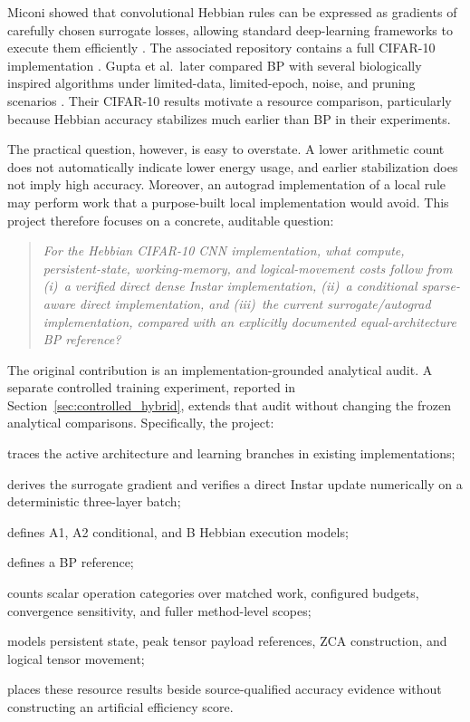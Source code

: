 \documentclass{article}
\begin{document}
    Miconi showed that convolutional Hebbian rules can be expressed as gradients of carefully chosen surrogate losses, allowing standard deep-learning frameworks to execute them efficiently \citep{miconi2021hebbian}. The associated repository contains a full CIFAR-10 implementation \citep{miconi2021repo}. Gupta et al.\ later compared BP with several biologically inspired algorithms under limited-data, limited-epoch, noise, and pruning scenarios \citep{gupta2023bio}. Their CIFAR-10 results motivate a resource comparison, particularly because Hebbian accuracy stabilizes much earlier than BP in their experiments.
    
    The practical question, however, is easy to overstate. A lower arithmetic count does not automatically indicate lower energy usage, and earlier stabilization does not imply high accuracy. Moreover, an autograd implementation of a local rule may perform work that a purpose-built local implementation would avoid. This project therefore focuses on a concrete, auditable question:
    \begin{quote}
    \itshape
    For the Hebbian CIFAR-10 CNN implementation\cite{miconi2021repo}, what compute, persistent-state, working-memory, and logical-movement costs follow from (i)~a verified direct dense Instar implementation, (ii)~a conditional sparse-aware direct implementation, and (iii)~the current surrogate/autograd implementation, compared with an explicitly documented equal-architecture BP reference?
    \end{quote}
    
    {\color{red}The original contribution is an implementation-grounded analytical audit. A separate controlled training experiment, reported in Section~\ref{sec:controlled_hybrid}, extends that audit without changing the frozen analytical comparisons.} Specifically, the project:
    \begin{enumerate}[noitemsep]
    \item traces the active architecture and learning branches in existing implementations;
    \item derives the surrogate gradient and verifies a direct Instar update numerically on a deterministic three-layer batch;
    \item defines A1, A2 conditional, and B Hebbian execution models;
    \item defines a BP reference;
    {\color{red}\item counts scalar operation categories over matched work, configured budgets, convergence sensitivity, and fuller method-level scopes;}
    \item models persistent state, peak tensor payload references, ZCA construction, and logical tensor movement;
    \item places these resource results beside source-qualified accuracy evidence without constructing an artificial efficiency score.
    \end{enumerate}
    
\end{document}
